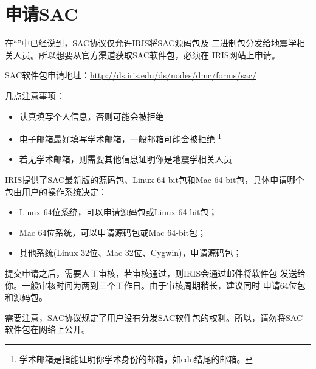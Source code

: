 \section{申请SAC}
在``''中已经说到，SAC协议仅允许IRIS将SAC源码包及
二进制包分发给地震学相关人员。所以想要从官方渠道获取SAC软件包，必须在
IRIS网站上申请。

SAC软件包申请地址：\url{http://ds.iris.edu/ds/nodes/dmc/forms/sac/}

几点注意事项：
\begin{itemize}
\item 认真填写个人信息，否则可能会被拒绝
\item 电子邮箱最好填写学术邮箱，一般邮箱可能会被拒绝
    \footnote{学术邮箱是指能证明你学术身份的邮箱，如edu结尾的邮箱。}
\item 若无学术邮箱，则需要其他信息证明你是地震学相关人员
\end{itemize}

IRIS提供了SAC最新版的源码包、Linux 64-bit包和Mac 64-bit包，具体申请哪个
包由用户的操作系统决定：
\begin{itemize}
\item Linux 64位系统，可以申请源码包或Linux 64-bit包；
\item Mac 64位系统，可以申请源码包或Mac 64-bit包；
\item 其他系统(Linux 32位、Mac 32位、Cygwin)，申请源码包；
\end{itemize}

提交申请之后，需要人工审核，若审核通过，则IRIS会通过邮件将软件包
发送给你。一般审核时间为两到三个工作日。由于审核周期稍长，建议同时
申请64位包和源码包。

需要注意，SAC协议规定了用户没有分发SAC软件包的权利。所以，请勿将SAC
软件包在网络上公开。
